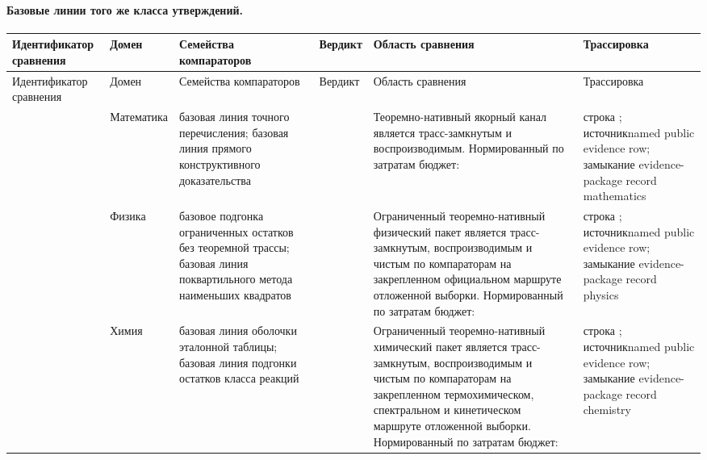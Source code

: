 \paragraph{Базовые линии того же класса утверждений.}
\begingroup
\scriptsize
\setlength{\emergencystretch}{1.5em}
\setlength{\tabcolsep}{2pt}
\setlength{\LTleft}{0pt}
\setlength{\LTright}{0pt}
\begin{longtable}{@{}L{0.14\textwidth}L{0.10\textwidth}L{0.17\textwidth}L{0.10\textwidth}L{0.23\textwidth}L{0.18\textwidth}@{}}
\toprule
Идентификатор сравнения & Домен & Семейства компараторов & Вердикт & Область сравнения & Трассировка \\
\midrule
\endfirsthead
\toprule
Идентификатор сравнения & Домен & Семейства компараторов & Вердикт & Область сравнения & Трассировка \\
\midrule
\endhead
{} & Математика & базовая линия точного перечисления; базовая линия прямого конструктивного доказательства &  & Теоремно-нативный якорный канал является трасс-замкнутым и воспроизводимым. \allowbreak Нормированный по затратам бюджет:  & строка ; \allowbreak источникnamed public evidence row; \allowbreak замыкание evidence-package record mathematics \\
 & Физика & базовое подгонка ограниченных остатков без теоремной трассы; базовая линия поквартильного метода наименьших квадратов &  & Ограниченный теоремно-нативный физический пакет является трасс-замкнутым, воспроизводимым и чистым по компараторам на закрепленном официальном маршруте отложенной выборки. \allowbreak Нормированный по затратам бюджет:  & строка ; \allowbreak источникnamed public evidence row; \allowbreak замыкание evidence-package record physics \\
 & Химия & базовая линия оболочки эталонной таблицы; базовая линия подгонки остатков класса реакций &  & Ограниченный теоремно-нативный химический пакет является трасс-замкнутым, воспроизводимым и чистым по компараторам на закрепленном термохимическом, спектральном и кинетическом маршруте отложенной выборки. \allowbreak Нормированный по затратам бюджет:  & строка ; \allowbreak источникnamed public evidence row; \allowbreak замыкание evidence-package record chemistry \\

\end{longtable}
